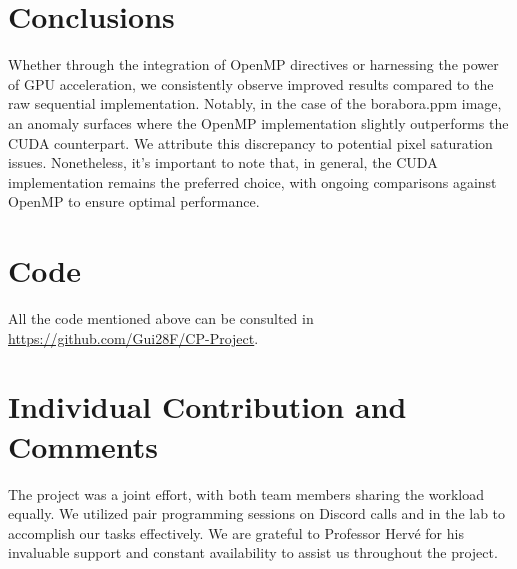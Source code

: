 \documentclass[sigconf]{acmart}
\begin{document}
\section{Conclusions}
Whether through the integration of OpenMP directives or harnessing the power of GPU acceleration, we consistently observe improved results compared to the raw sequential implementation. Notably, in the case of the borabora.ppm image, an anomaly surfaces where the OpenMP implementation slightly outperforms the CUDA counterpart. We attribute this discrepancy to potential pixel saturation issues. Nonetheless, it's important to note that, in general, the CUDA implementation remains the preferred choice, with ongoing comparisons against OpenMP to ensure optimal performance.

\section{Code}
All the code mentioned above can be consulted in \url{https://github.com/Gui28F/CP-Project}.
\section{Individual Contribution and Comments}
The project was a joint effort, with both team members sharing the workload equally. We utilized pair programming sessions on Discord calls and in the lab to accomplish our tasks effectively. We are grateful to Professor Hervé for his invaluable support and constant availability to assist us throughout the project.


\end{document}
